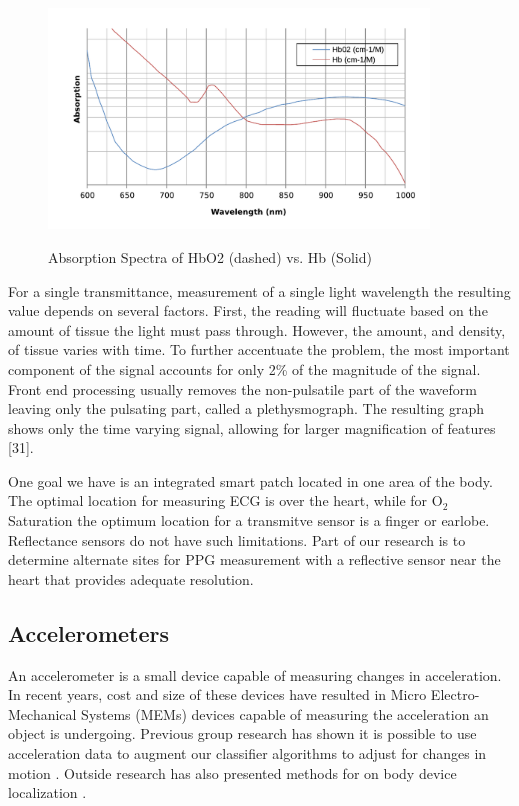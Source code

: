 \begin{figure}
	\begin{center}
		\label{fig:Hemoglobin}
		\includegraphics[scale=1,width=0.9\textwidth]{Images/hemoglobin.pdf} 
		\caption{Absorption Spectra of HbO2 (dashed) vs. Hb (Solid) }
	\end{center}
\end{figure}

For a single transmittance, measurement of a single light wavelength the resulting value depends on several factors. First, the reading will fluctuate based on the amount of tissue the light must pass through. However, the amount, and density, of tissue varies with time. To further accentuate the problem, the most important component of the signal accounts for only 2\% of the magnitude of the signal. Front end processing usually removes the non-pulsatile part of the waveform leaving only the pulsating part, called a plethysmograph. The resulting graph shows only the time varying signal, allowing for larger magnification of features [31].

One goal we have is an integrated smart patch located in one area of the body. The optimal location for measuring ECG is over the heart, while for O$_2$ Saturation the optimum location for a transmitve sensor is a finger or earlobe. Reflectance sensors do not have such limitations. Part of our research is to determine alternate sites for PPG measurement with a reflective sensor near the heart that provides adequate resolution.

\subsection{Accelerometers}
\label{subsec:Accelerometers}
An accelerometer is a small device capable of measuring changes in acceleration. In recent years, cost and size of these devices have resulted in Micro Electro-Mechanical Systems (MEMs) devices capable of measuring the acceleration an object is undergoing. Previous group research has shown it is possible to use acceleration data to augment our classifier algorithms to adjust for changes in motion \cite{Shannon2012}.  Outside research has also presented methods for on body device localization \cite{Vahdatpour2011}. 


